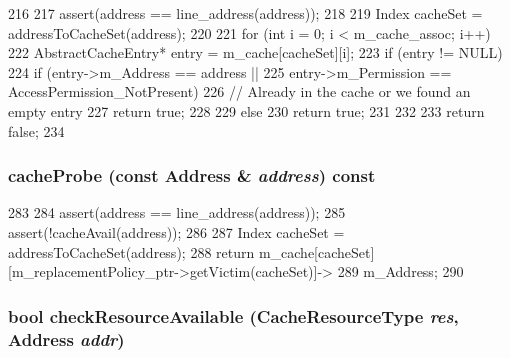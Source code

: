 \begin{DoxyCode}
216 {
217     assert(address == line_address(address));
218 
219     Index cacheSet = addressToCacheSet(address);
220 
221     for (int i = 0; i < m_cache_assoc; i++) {
222         AbstractCacheEntry* entry = m_cache[cacheSet][i];
223         if (entry != NULL) {
224             if (entry->m_Address == address ||
225                 entry->m_Permission == AccessPermission_NotPresent) {
226                 // Already in the cache or we found an empty entry
227                 return true;
228             }
229         } else {
230             return true;
231         }
232     }
233     return false;
234 }
\end{DoxyCode}
\hypertarget{classCacheMemory_ab7017a4e3b3db35ecd4f778ec0f61cdf}{
\subsubsection[{cacheProbe}]{ cacheProbe (const {\bf Address} \& {\em address}) const}}
\label{classCacheMemory_ab7017a4e3b3db35ecd4f778ec0f61cdf}



\begin{DoxyCode}
283 {
284     assert(address == line_address(address));
285     assert(!cacheAvail(address));
286 
287     Index cacheSet = addressToCacheSet(address);
288     return m_cache[cacheSet][m_replacementPolicy_ptr->getVictim(cacheSet)]->
289         m_Address;
290 }
\end{DoxyCode}
\hypertarget{classCacheMemory_a89094cea0857bcf3a16b429c0b3f8bfe}{
\subsubsection[{checkResourceAvailable}]{\setlength{\rightskip}{0pt plus 5cm}bool checkResourceAvailable (CacheResourceType {\em res}, \/  {\bf Address} {\em addr})}}
\label{classCacheMemory_a89094cea0857bcf3a16b429c0b3f8bfe}



